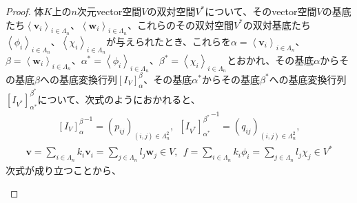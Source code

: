 \documentclass[dvipdfmx]{jsarticle}
\begin{document}
\begin{proof}
体$K$上の$n$次元vector空間$V$の双対空間$V^{*}$について、そのvector空間$V$の基底たち$\left\langle \mathbf{v}_{i} \right\rangle_{i \in \varLambda_{n}}$、$\left\langle \mathbf{w}_{i} \right\rangle_{i \in \varLambda_{n}}$、これらのその双対空間$V^{*}$の双対基底たち$\left\langle \phi_{i} \right\rangle_{i \in \varLambda_{n}}$、$\left\langle \chi_{i} \right\rangle_{i \in \varLambda_{n}}$が与えられたとき、これらを$\alpha = \left\langle \mathbf{v}_{i} \right\rangle_{i \in \varLambda_{n}}$、$\beta = \left\langle \mathbf{w}_{i} \right\rangle_{i \in \varLambda_{n}}$、$\alpha^{*} = \left\langle \phi_{i} \right\rangle_{i \in \varLambda_{n}}$、$\beta^{*} = \left\langle \chi_{i} \right\rangle_{i \in \varLambda_{n}}$とおかれ、その基底$\alpha$からその基底$\beta$への基底変換行列$\left[ I_{V} \right]^{\beta}_{\alpha}$、その基底$\alpha^{*}$からその基底$\beta^{*}$への基底変換行列$\left[ I_{V^{*}} \right]^{\beta^{*}}_{\alpha^{*}}$について、次式のようにおかれると、
\begin{align*}
{\left[ I_{V} \right]^{\beta}_{\alpha}}^{- 1} = \left( p_{ij} \right)_{(i,j) \in \varLambda_{n}^{2}},\ \ {\left[ I_{V^{*}} \right]^{\beta^{*}}_{\alpha^{*}}}^{- 1} = \left( q_{ij} \right)_{(i,j) \in \varLambda_{n}^{2}},
\end{align*}
\begin{align*}
\mathbf{v} = \sum_{i \in \varLambda_{n}} {k_{i}\mathbf{v}_{i}} = \sum_{j \in \varLambda_{n}} {l_{j}\mathbf{w}_{j}} \in V,\ \ f = \sum_{i \in \varLambda_{n}} {k_{i}\phi_{i}} = \sum_{j \in \varLambda_{n}} {l_{j}\chi_{j}} \in V^{*}
\end{align*}
次式が成り立つことから、
\begin{center}
\end{center}
\end{proof}
\end{document}
